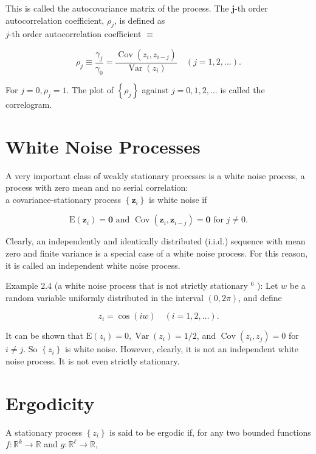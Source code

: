\documentclass[10pt]{article}
\begin{document}
This is called the autocovariance matrix of the process. The $\boldsymbol{j}$-th order autocorrelation coefficient, $\rho_{j}$, is defined as\\
$j$-th order autocorrelation coefficient $\equiv$


\begin{equation*}
\rho_{j} \equiv \frac{\gamma_{j}}{\gamma_{0}}=\frac{\operatorname{Cov}\left(z_{i}, z_{i-j}\right)}{\operatorname{Var}\left(z_{i}\right)} \quad(j=1,2, \ldots) . \tag{2.2.3}
\end{equation*}


For $j=0, \rho_{j}=1$. The plot of $\left\{\rho_{j}\right\}$ against $j=0,1,2, \ldots$ is called the correlogram.

\section*{White Noise Processes}
A very important class of weakly stationary processes is a white noise process, a process with zero mean and no serial correlation:\\
a covariance-stationary process $\left\{\mathbf{z}_{i}\right\}$ is white noise if

$$
\mathrm{E}\left(\mathbf{z}_{i}\right)=\mathbf{0} \text { and } \operatorname{Cov}\left(\mathbf{z}_{i}, \mathbf{z}_{i-j}\right)=\mathbf{0} \text { for } j \neq 0 .
$$

Clearly, an independently and identically distributed (i.i.d.) sequence with mean zero and finite variance is a special case of a white noise process. For this reason, it is called an independent white noise process.

Example 2.4 (a white noise process that is not strictly stationary ${ }^{6}$ ): Let $w$ be a random variable uniformly distributed in the interval $(0,2 \pi)$, and define

$$
z_{i}=\cos (i w) \quad(i=1,2, \ldots) .
$$

It can be shown that $\mathrm{E}\left(z_{i}\right)=0, \operatorname{Var}\left(z_{i}\right)=1 / 2$, and $\operatorname{Cov}\left(z_{i}, z_{j}\right)=0$ for $i \neq j$. So $\left\{z_{i}\right\}$ is white noise. However, clearly, it is not an independent white noise process. It is not even strictly stationary.

\section*{Ergodicity}
A stationary process $\left\{z_{i}\right\}$ is said to be ergodic if, for any two bounded functions $f: \mathbb{R}^{k} \rightarrow \mathbb{R}$ and $g: \mathbb{R}^{\ell} \rightarrow \mathbb{R}$,
\end{document}
